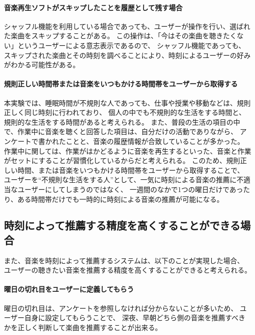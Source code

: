 \documentclass[11pt, onecolumn]{jsarticle}
\begin{document}
\paragraph{音楽再生ソフトがスキップしたことを履歴として残す場合}
シャッフル機能を利用している場合であっても、ユーザーが操作を行い、選ばれた楽曲をスキップすることがある。
この操作は、「今はその楽曲を聴きたくない」というユーザーによる意志表示であるので、
シャッフル機能であっても、スキップされた楽曲とその時刻を調べることにより、時刻によるユーザーの好みがわかる可能性がある。

\paragraph{規則正しい時間帯または音楽をいつもかける時間帯をユーザーから取得する}
本実験では、睡眠時間が不規則な人であっても、仕事や授業や移動などは、規則正しく同じ時刻に行われており、
個人の中でも不規則的な生活をする時間と、規則的な生活をする時間があると考えられる。
また、普段の生活の項目の中で、作業中に音楽を聴くと回答した項目は、自分だけの活動でありながら、
アンケートで書かれたことと、音楽の履歴情報が合致していることが多かった。
作業中に関しては、作業がはかどるように音楽を再生するといった、音楽と作業がセットにすることが習慣化しているからだと考えられる。
このため、規則正しい時間、または音楽をいつもかける時間帯をユーザーから取得することで、
ユーザーを``不規則な生活をする人''として、一気に時刻による音楽の推薦に不適当なユーザーにしてしまうのではなく、
一週間のなかで1つの曜日だけであったり、ある時間帯だけでも一時的に時刻による音楽の推薦が可能になる。

\subsection{時刻によって推薦する精度を高くすることができる場合} 
また、音楽を時刻によって推薦するシステムは、以下のことが実現した場合、
ユーザーの聴きたい音楽を推薦する精度を高くすることができると考えられる。
\paragraph{曜日の切れ目をユーザーに定義してもらう}
曜日の切れ目は、アンケートを参照しなければ分からないことが多いため、
ユーザー自身に設定してもらうことで、
深夜、早朝どちら側の音楽を推薦すべきかを正しく判断して楽曲を推薦することが出来る。
\end{document}
